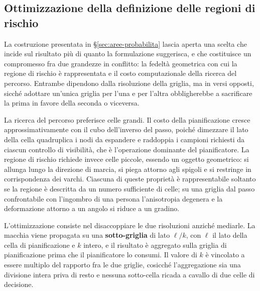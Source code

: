 
\subsection{Ottimizzazione della definizione delle regioni di rischio}
\label{sec:risoluzione-rischio}

La costruzione presentata in \S\ref{sec:aree-probabilita} lascia aperta una scelta che incide
sul risultato più di quanto la formulazione suggerisca, e che costituisce un compromesso fra
due grandezze in conflitto: la fedeltà geometrica con cui la regione di rischio è
rappresentata e il costo computazionale della ricerca del percorso. Entrambe dipendono dalla
risoluzione della griglia, ma in versi opposti, sicché adottare un'unica griglia per l'una e
per l'altra obbligherebbe a sacrificare la prima in favore della seconda o viceversa.

La ricerca del percorso preferisce celle grandi. Il costo della pianificazione cresce
approssimativamente con il cubo dell'inverso del passo, poiché dimezzare il lato della cella
quadruplica i nodi da espandere e raddoppia i campioni richiesti da ciascun controllo di
visibilità, che è l'operazione dominante del pianificatore. La regione di rischio richiede
invece celle piccole, essendo un oggetto geometrico: si allunga lungo la direzione di marcia,
si piega attorno agli spigoli e si restringe in corrispondenza dei varchi. Ciascuna di queste
proprietà è rappresentabile soltanto se la regione è descritta da un numero sufficiente di
celle; su una griglia dal passo confrontabile con l'ingombro di una persona l'anisotropia
degenera e la deformazione attorno a un angolo si riduce a un gradino.

L'ottimizzazione consiste nel disaccoppiare le due risoluzioni anziché mediarle. La macchia
viene propagata su una \textbf{sotto-griglia} di lato $\ell/k$, con $\ell$ il lato della cella
di pianificazione e $k$ intero, e il risultato è aggregato sulla griglia di pianificazione
prima che il pianificatore lo consumi. Il valore di $k$ è vincolato a essere multiplo del
rapporto fra le due griglie, cosicché l'aggregazione sia una divisione intera priva di resto e
nessuna sotto-cella ricada a cavallo di due celle di decisione.

